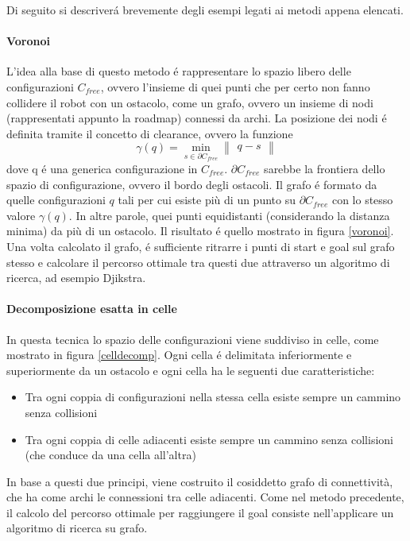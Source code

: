 \documentclass[14pt,a4paper]{extarticle}
\begin{document}
Di seguito si descriverá brevemente degli esempi legati ai metodi appena elencati.

\paragraph{Voronoi} L'idea alla base di questo metodo é rappresentare lo spazio libero delle configurazioni \(C_{free}\), ovvero l'insieme di quei punti che per certo non fanno collidere il robot con un ostacolo, come un grafo, ovvero un insieme di nodi (rappresentati appunto la roadmap) connessi da archi. La posizione dei nodi é definita tramite il concetto di clearance, ovvero la funzione \[\gamma(q) = \min_{s\in\partial C_{free}} \begin{Vmatrix}q-s\end{Vmatrix}\] dove q é una generica configurazione in \(C_{free}\). \(\partial C_{free}\) sarebbe la frontiera dello spazio di configurazione, ovvero il bordo degli ostacoli. Il grafo é formato da quelle configurazioni \(q\) tali per cui esiste più di un punto su \(\partial C_{free}\) con lo stesso valore \(\gamma(q)\). In altre parole, quei punti equidistanti (considerando la distanza minima) da più di un ostacolo. Il risultato é quello mostrato in figura \ref{voronoi}. Una volta calcolato il grafo, é sufficiente ritrarre i punti di start e goal sul grafo stesso e calcolare il percorso ottimale tra questi due attraverso un algoritmo di ricerca, ad esempio Djikstra.

\paragraph{Decomposizione esatta in celle} In questa tecnica lo spazio delle configurazioni viene suddiviso in celle, come mostrato in figura \ref{celldecomp}. Ogni cella é delimitata inferiormente e superiormente da un ostacolo e ogni cella ha le seguenti due caratteristiche:
\begin{itemize}
\item Tra ogni coppia di configurazioni nella stessa cella esiste sempre un cammino senza collisioni
\item Tra ogni coppia di celle adiacenti esiste sempre un cammino senza collisioni (che conduce da una cella all'altra)
\end{itemize}
In base a questi due principi, viene costruito il cosiddetto grafo di connettività, che ha come archi le connessioni tra celle adiacenti. Come nel metodo precedente, il calcolo del percorso ottimale per raggiungere il goal consiste nell'applicare un algoritmo di ricerca su grafo.
\end{document}
